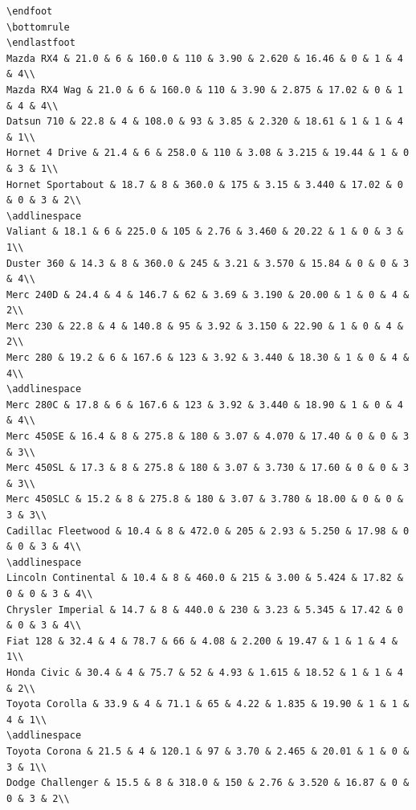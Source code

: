 \documentclass[a4paper, nobind]{templates/ociamthesis}
\begin{document}
\begin{verbatim}
\endfoot
\bottomrule
\endlastfoot
Mazda RX4 & 21.0 & 6 & 160.0 & 110 & 3.90 & 2.620 & 16.46 & 0 & 1 & 4 & 4\\
Mazda RX4 Wag & 21.0 & 6 & 160.0 & 110 & 3.90 & 2.875 & 17.02 & 0 & 1 & 4 & 4\\
Datsun 710 & 22.8 & 4 & 108.0 & 93 & 3.85 & 2.320 & 18.61 & 1 & 1 & 4 & 1\\
Hornet 4 Drive & 21.4 & 6 & 258.0 & 110 & 3.08 & 3.215 & 19.44 & 1 & 0 & 3 & 1\\
Hornet Sportabout & 18.7 & 8 & 360.0 & 175 & 3.15 & 3.440 & 17.02 & 0 & 0 & 3 & 2\\
\addlinespace
Valiant & 18.1 & 6 & 225.0 & 105 & 2.76 & 3.460 & 20.22 & 1 & 0 & 3 & 1\\
Duster 360 & 14.3 & 8 & 360.0 & 245 & 3.21 & 3.570 & 15.84 & 0 & 0 & 3 & 4\\
Merc 240D & 24.4 & 4 & 146.7 & 62 & 3.69 & 3.190 & 20.00 & 1 & 0 & 4 & 2\\
Merc 230 & 22.8 & 4 & 140.8 & 95 & 3.92 & 3.150 & 22.90 & 1 & 0 & 4 & 2\\
Merc 280 & 19.2 & 6 & 167.6 & 123 & 3.92 & 3.440 & 18.30 & 1 & 0 & 4 & 4\\
\addlinespace
Merc 280C & 17.8 & 6 & 167.6 & 123 & 3.92 & 3.440 & 18.90 & 1 & 0 & 4 & 4\\
Merc 450SE & 16.4 & 8 & 275.8 & 180 & 3.07 & 4.070 & 17.40 & 0 & 0 & 3 & 3\\
Merc 450SL & 17.3 & 8 & 275.8 & 180 & 3.07 & 3.730 & 17.60 & 0 & 0 & 3 & 3\\
Merc 450SLC & 15.2 & 8 & 275.8 & 180 & 3.07 & 3.780 & 18.00 & 0 & 0 & 3 & 3\\
Cadillac Fleetwood & 10.4 & 8 & 472.0 & 205 & 2.93 & 5.250 & 17.98 & 0 & 0 & 3 & 4\\
\addlinespace
Lincoln Continental & 10.4 & 8 & 460.0 & 215 & 3.00 & 5.424 & 17.82 & 0 & 0 & 3 & 4\\
Chrysler Imperial & 14.7 & 8 & 440.0 & 230 & 3.23 & 5.345 & 17.42 & 0 & 0 & 3 & 4\\
Fiat 128 & 32.4 & 4 & 78.7 & 66 & 4.08 & 2.200 & 19.47 & 1 & 1 & 4 & 1\\
Honda Civic & 30.4 & 4 & 75.7 & 52 & 4.93 & 1.615 & 18.52 & 1 & 1 & 4 & 2\\
Toyota Corolla & 33.9 & 4 & 71.1 & 65 & 4.22 & 1.835 & 19.90 & 1 & 1 & 4 & 1\\
\addlinespace
Toyota Corona & 21.5 & 4 & 120.1 & 97 & 3.70 & 2.465 & 20.01 & 1 & 0 & 3 & 1\\
Dodge Challenger & 15.5 & 8 & 318.0 & 150 & 2.76 & 3.520 & 16.87 & 0 & 0 & 3 & 2\\

\end{verbatim}
\end{document}
